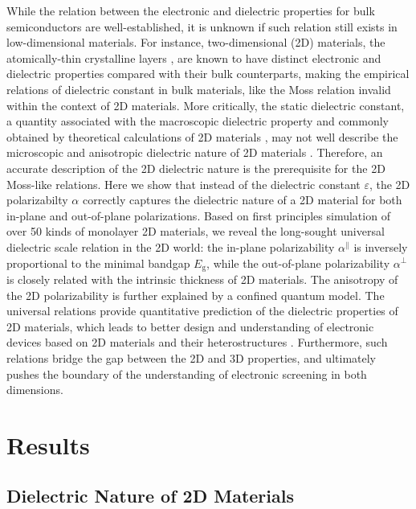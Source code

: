 \documentclass[journal=ancac3,manuscript=article,email=true,hyperref=true,keywords=false]{achemso}
\begin{document}
While the relation between the electronic and dielectric properties
for bulk semiconductors are well-established, it is unknown if such
relation still exists in low-dimensional materials. For instance,
two-dimensional (2D) materials, the atomically-thin crystalline layers
\cite{Novoselov_2016}, are known to have distinct electronic
\cite{Mak_2010,Tran_2014} and dielectric properties
\cite{Keldysh_1979_eps_multi,Sharma_1985} compared with their bulk
counterparts, making the empirical relations of dielectric constant in
bulk materials, like the Moss relation invalid within the context of
2D materials. More critically, the static dielectric constant, a
quantity associated with the macroscopic dielectric property and
commonly obtained by theoretical calculations of 2D materials
\cite{Ramasubramaniam_2012,Wang_2016_Aip,Laturia_2018}, may not well
describe the microscopic and anisotropic dielectric nature of 2D
materials
\cite{Cudazzo_2010_screen2D,Cudazzo_2011_screening_2D}. Therefore, an
accurate description of the 2D dielectric nature is the prerequisite
for the 2D Moss-like relations. Here we show that instead of the
dielectric constant $\varepsilon$, the 2D polarizabilty $\alpha$
correctly captures the dielectric nature of a 2D material for both
in-plane and out-of-plane polarizations. Based on first principles
simulation of over 50 kinds of monolayer 2D materials, we reveal the
long-sought universal dielectric scale relation in the 2D world: the
in-plane polarizability $\alpha^{\parallel}$ is inversely proportional
to the minimal bandgap $E_{\mathrm{g}}$, while the out-of-plane
polarizability $\alpha^{\perp}$ is closely related with the intrinsic
thickness of 2D materials. The anisotropy of the 2D polarizability is
further explained by a confined quantum model. The universal relations
provide quantitative prediction of the dielectric properties of 2D
materials, which leads to better design and understanding of
electronic devices based on 2D materials and their heterostructures
. Furthermore, such relations bridge the gap between the 2D and 3D
properties, and ultimately pushes the boundary of the understanding of
electronic screening in both dimensions.

\section{Results}
\label{sec:org752ca78}

\subsection{Dielectric Nature of 2D Materials}
\label{sec:2d}
\end{document}
